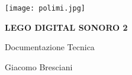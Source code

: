 

\begin{titlepage}
	
    \begin{center}
    
		\texttt{[image: polimi.jpg]}

        \vspace*{3cm}
        
        
        \Huge
        \textbf{LEGO DIGITAL SONORO 2}
        
        \vspace{0.5cm}
        \LARGE
        Documentazione Tecnica
        
        \vspace{1.5cm}
                
        \vfill
        
        
        \vspace{0.8cm}
        
        
        \Large
        Giacomo Bresciani

        
        
    \end{center}
\end{titlepage}
